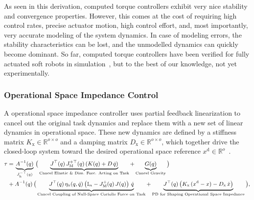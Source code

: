 As seen in this derivation, computed torque controllers exhibit very nice stability and convergence properties. However, this comes at the cost of requiring high control rates, precise actuator motion, high control effort, and, most importantly, very accurate modeling of the system dynamics. In case of modeling errors, the stability characteristics can be lost, and the unmodelled dynamics can quickly become dominant.
So far, computed torque controllers have been verified for fully actuated soft robots in simulation~\citep{boyer2006macro, pustina2024unified}, but to the best of our knowledge, not yet experimentally.


\subsubsection{Operational Space Impedance Control}
A operational space impedance controller uses partial feedback linearization to cancel out the original task dynamics and replace them with a new set of linear dynamics in operational space. These new dynamics are defined by a stiffness matrix $K_\mathrm{x} \in \mathbb{R}^{o \times o}$ and a damping matrix $D_\mathrm{x} \in \mathbb{R}^{o \times o}$, which together drive the closed-loop system toward the desired operational space reference $x^\mathrm{d} \in \mathbb{R}^o$~\citep{khatib1987unified, della2020model}.
\begin{equation}\small
\begin{split}
    \tau =& \: \underbrace{A^{-1}(q)}_{J_\mathrm{h}^{-\top}(q)} \, \big ( \underbrace{J^\top(q) \, J_\mathrm{M}^{+\top}(q) \left ( K(q) + D \, \dot{q} \right )}_\text{Cancel Elastic \& Diss. Forc. Acting on Task} + \underbrace{G(q)}_\text{Cancel Gravity} \big )\\
    + & \: A^{-1}(q) \, \big ( \underbrace{J^\top(q) \, \eta_\mathrm{x}(q,\dot{q}) \left ( \mathbb{I}_n - J_\mathrm{M}^{+}(q) \, J(q)  \right ) \, \dot{q}}_\text{Cancel Coupling of Null-Space Coriolis Force on Task} + \underbrace{J^\top(q) \left ( K_\mathrm{x} \, (x^\mathrm{d} - x) - D_\mathrm{x} \, \dot{x} \right )}_{\text{PD for Shaping Operational Space Impedance}} \big ),
\end{split}
\end{equation}
